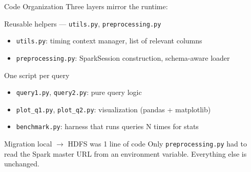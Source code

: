 \documentclass[aspectratio=169]{beamer}
\begin{document}
\begin{frame}{Code Organization}
Three layers mirror the runtime:

\begin{block}{Reusable helpers --- \texttt{utils.py}, \texttt{preprocessing.py}}
\begin{itemize}
    \item \texttt{utils.py}: timing context manager, list of relevant columns
    \item \texttt{preprocessing.py}: SparkSession construction, schema-aware loader
\end{itemize}
\end{block}

\begin{block}{One script per query}
\begin{itemize}
    \item \texttt{query1.py}, \texttt{query2.py}: pure query logic
    \item \texttt{plot\_q1.py}, \texttt{plot\_q2.py}: visualization (pandas + matplotlib)
    \item \texttt{benchmark.py}: harness that runs queries N times for stats
\end{itemize}
\end{block}

\begin{alertblock}{Migration local $\rightarrow$ HDFS was 1 line of code}
Only \texttt{preprocessing.py} had to read the Spark master URL from
an environment variable. Everything else is unchanged.
\end{alertblock}

\end{frame}

\end{document}
